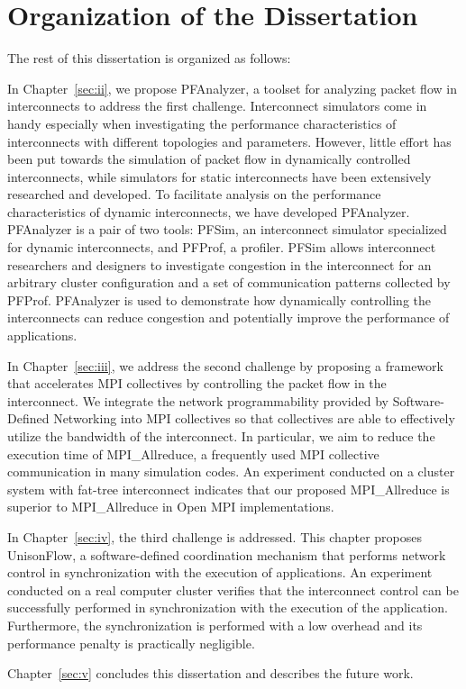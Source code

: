 \section{Organization of the Dissertation}

The rest of this dissertation is organized as follows:

In Chapter~\ref{sec:ii}, we propose PFAnalyzer, a toolset for analyzing packet
flow in interconnects to address the first challenge. Interconnect simulators
come in handy especially when investigating the performance characteristics of
interconnects with different topologies and parameters. However, little effort
has been put towards the simulation of packet flow in dynamically controlled
interconnects, while simulators for static interconnects have been extensively
researched and developed. To facilitate analysis on the performance
characteristics of dynamic interconnects, we have developed PFAnalyzer.
PFAnalyzer is a pair of two tools: PFSim, an interconnect simulator
specialized for dynamic interconnects, and PFProf, a profiler. PFSim allows
interconnect researchers and designers to investigate congestion in the
interconnect for an arbitrary cluster configuration and a set of communication
patterns collected by PFProf. PFAnalyzer is used to demonstrate how
dynamically controlling the interconnects can reduce congestion and
potentially improve the performance of applications.

In Chapter~\ref{sec:iii}, we address the second challenge by proposing a
framework that accelerates MPI collectives by controlling the packet flow in
the interconnect. We integrate the network programmability provided by
Software-Defined Networking into MPI collectives so that collectives are able
to effectively utilize the bandwidth of the interconnect. In particular, we
aim to reduce the execution time of MPI\_Allreduce, a frequently used MPI
collective communication in many simulation codes. An experiment conducted on
a cluster system with fat-tree interconnect indicates that our proposed
MPI\_Allreduce is superior to MPI\_Allreduce in Open MPI implementations.

In Chapter~\ref{sec:iv}, the third challenge is addressed. This chapter
proposes UnisonFlow, a software-defined coordination mechanism that performs
network control in synchronization with the execution of applications. An
experiment conducted on a real computer cluster verifies that the interconnect
control can be successfully performed in synchronization with the execution of
the application. Furthermore, the synchronization is performed with a low
overhead and its performance penalty is practically negligible.

Chapter~\ref{sec:v} concludes this dissertation and describes the future work.
